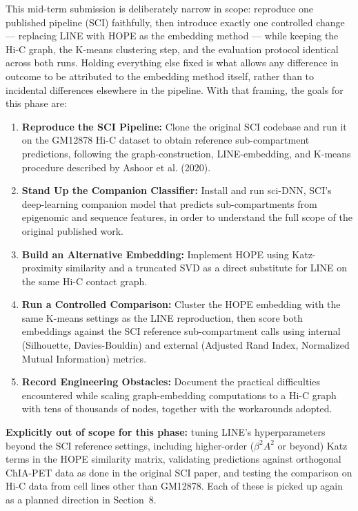 \documentclass[12pt]{article}
\begin{document}
This mid-term submission is deliberately narrow in scope: reproduce one published pipeline (SCI)
faithfully, then introduce exactly one controlled change — replacing LINE with HOPE as the
embedding method — while keeping the Hi-C graph, the K-means clustering step, and the
evaluation protocol identical across both runs. Holding everything else fixed is what allows any
difference in outcome to be attributed to the embedding method itself, rather than to incidental
differences elsewhere in the pipeline. With that framing, the goals for this phase are:

\begin{enumerate}
    \item \textbf{Reproduce the SCI Pipeline:} Clone the original SCI codebase and run it on the
    GM12878 Hi-C dataset to obtain reference sub-compartment predictions, following the
    graph-construction, LINE-embedding, and K-means procedure described by Ashoor et al. (2020).

    \item \textbf{Stand Up the Companion Classifier:} Install and run sci-DNN, SCI's deep-learning
    companion model that predicts sub-compartments from epigenomic and sequence features, in
    order to understand the full scope of the original published work.

    \item \textbf{Build an Alternative Embedding:} Implement HOPE using Katz-proximity similarity
    and a truncated SVD as a direct substitute for LINE on the same Hi-C contact graph.

    \item \textbf{Run a Controlled Comparison:} Cluster the HOPE embedding with the same K-means
    settings as the LINE reproduction, then score both embeddings against the SCI reference
    sub-compartment calls using internal (Silhouette, Davies-Bouldin) and external (Adjusted Rand
    Index, Normalized Mutual Information) metrics.

    \item \textbf{Record Engineering Obstacles:} Document the practical difficulties encountered
    while scaling graph-embedding computations to a Hi-C graph with tens of thousands of nodes,
    together with the workarounds adopted.
\end{enumerate}

\textbf{Explicitly out of scope for this phase:} tuning LINE's hyperparameters beyond the SCI
reference settings, including higher-order ($\beta^2 A^2$ or beyond) Katz terms in the HOPE
similarity matrix, validating predictions against orthogonal ChIA-PET data as done in the
original SCI paper, and testing the comparison on Hi-C data from cell lines other than GM12878.
Each of these is picked up again as a planned direction in Section~8.
\end{document}
